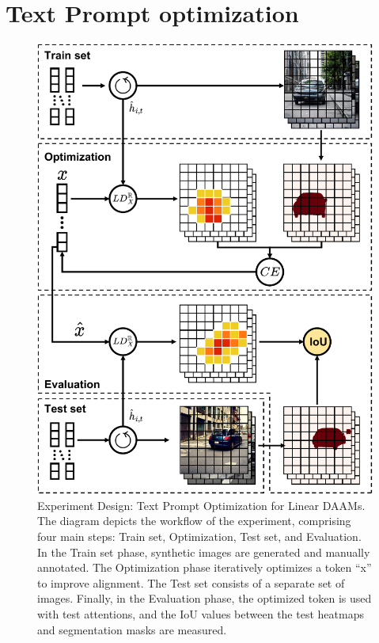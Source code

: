 \section{Text Prompt optimization}
\label{sec:experiment-optimization}


\begin{figure}
    \centering
    \includegraphics[width=0.98\columnwidth]{img/4-experiments/experiment-diagram.pdf}
    \caption[Experiment Design: Text Prompt Optimization for Linear DAAMs]{Experiment Design: Text Prompt Optimization for Linear DAAMs. The diagram depicts the workflow of the experiment, comprising four main steps: Train set, Optimization, Test set, and Evaluation. In the Train set phase, synthetic images are generated and manually annotated. The Optimization phase iteratively optimizes a token ``x'' to improve alignment. The Test set consists of a separate set of images. Finally, in the Evaluation phase, the optimized token is used with test attentions, and the IoU values between the test heatmaps and segmentation masks are measured.}
    \label{fig:experiment-design}
\end{figure}



